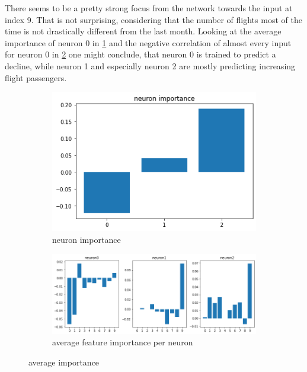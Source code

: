 \documentclass{article}
\begin{document}
There seems to be a pretty strong focus from the network towards the input at index 9. That is not surprising, considering that the number of flights most of the time is not drastically different from the last month. Looking at the average importance of neuron 0 in \ref{fig:lin_model_ani} and the negative correlation of almost every input for neuron 0 in \ref{fig:lin_model_anfi} one might conclude, that neuron 0 is trained to predict a decline, while neuron 1 and especially neuron 2 are mostly predicting increasing flight passengers.

\begin{figure}[h!]
     \centering
     \begin{subfigure}[b]{0.2\textwidth}
         \centering
         \includegraphics[scale=0.4]{results/linear_model_avg_neuron_importance.png}
         \caption{neuron importance}
         \label{fig:lin_model_ani}
     \end{subfigure}
     \hspace*{\fill}
     \begin{subfigure}[b]{0.4\textwidth}
         \centering
         \includegraphics[scale=0.4]{results/linear_model_avg_feature_per_neuron_importance.png}
         \caption{average feature importance per neuron}
         \label{fig:lin_model_anfi}
     \end{subfigure}
     \hspace*{\fill}
        \caption{average importance}
        \label{fig:lin_model_a_f_i}
\end{figure}
\end{document}
